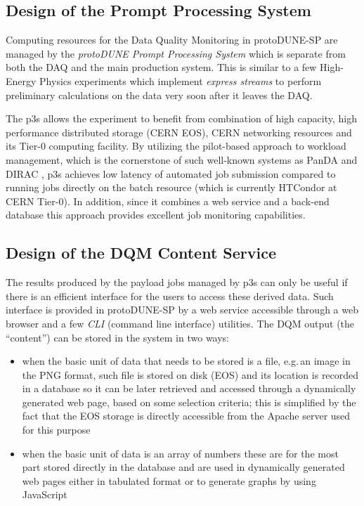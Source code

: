 \documentclass{webofc}
\newcommand{\pd}{protoDUNE\xspace}
\begin{document}
\subsection{Design of the Prompt Processing System}

Computing resources for the Data Quality Monitoring in \pd-SP are managed by
the  \textit{\pd Prompt Processing System}
which is separate from both the DAQ and the main production system.
This is similar to a few High-Energy Physics experiments which implement
 \textit{express streams} to perform preliminary calculations on the data very soon
after it leaves the DAQ.

The  p3s allows the experiment to benefit from combination of high capacity, high
performance distributed storage (CERN EOS), CERN networking resources and its Tier-0 computing facility.
By utilizing the pilot-based approach \cite{eps} to workload management, which is the cornerstone of such well-known
systems as PanDA and DIRAC \cite{panda,dirac}, p3s achieves low latency of automated job submission
compared to running jobs directly on the batch resource (which is currently HTCondor at CERN Tier-0).
In addition, since it combines a web service and a back-end database this approach provides excellent
job monitoring capabilities.


\subsection{Design of the DQM Content Service}
The results produced by the payload jobs managed by p3s can only be useful if there is an
efficient interface for the users to access these derived data. Such interface is provided in \pd-SP
by a web service accessible through a web browser and a few \textit{CLI} (command line interface) utilities.
The DQM output (the ``content'') can be stored in the system in two ways:
\begin{itemize}

\item when the basic unit of data that needs to be stored is a file, e.g.\,an image in the PNG format, such
file is stored on disk (EOS) and its location is recorded in a database so it can be later retrieved
and accessed through a dynamically generated web page,  based on some selection criteria; 
this is simplified by the fact that the EOS storage is directly accessible from the Apache server
used for this purpose

\item when the basic unit of data is an array of numbers these are for the most part stored directly
in the database and are used in dynamically generated web pages either in tabulated format or
to generate graphs by using JavaScript

\end{itemize}
\end{document}
